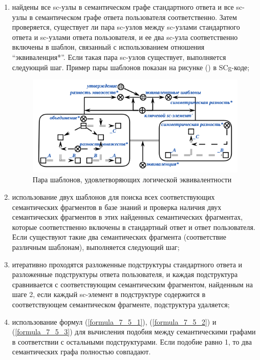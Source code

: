 \begin{enumerate}
	\item найдены все sc-узлы в семантическом графе стандартного ответа и все sc-узлы в семантическом графе ответа пользователя соответственно. Затем проверяется, существует ли пара sc-узлов между sc-узлами стандартного ответа и sc-узлами ответа пользователя, и ее два sc-узла соответственно включены в шаблон, связанный с использованием отношения ``эквиваленция*''. Если такая пара sc-узлов существует, выполняется следующий шаг. Пример пары шаблонов показан на рисунке (\textit{}) в SCg-коде;
	\begin{figure}[H]
		\includegraphics[scale=1]{author/part7/figures/equivalent_template_example.png}
		\caption{Пара шаблонов, удовлетворяющих логической эквивалентности}
		\label{fig:ET_example}
	\end{figure}
	
	\item использование двух шаблонов для поиска всех соответствующих семантических фрагментов в базе знаний и проверка наличия двух семантических фрагментов в этих найденных семантических фрагментах, которые соответственно включены в стандартный ответ и ответ пользователя. Если существуют такие два семантических фрагмента (соответствие различным шаблонам), выполняется следующий шаг;
	
	\item итеративно проходятся разложенные подструктуры стандартного ответа и разложенные подструктуры ответа пользователя, и каждая подструктура сравнивается с соответствующим семантическим фрагментом, найденным на шаге 2, если каждый sc-элемент в подструктуре содержится в соответствующем семантическом фрагменте, подструктура удаляется;
	
	\item использование формул (\ref{formula_7_5_1}), (\ref{formula_7_5_2}) и (\ref{formula_7_5_3}) для вычисления подобия между семантическими графами в соответствии с остальными подструктурами. Если подобие равно 1, то два семантических графа полностью совпадают.
	
\end{enumerate}

